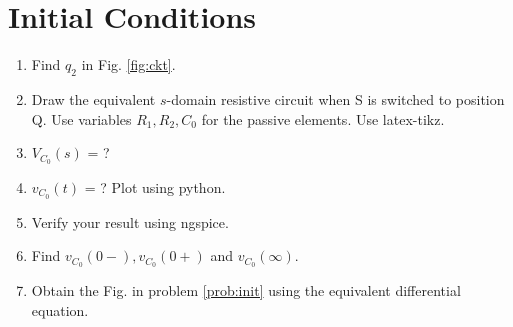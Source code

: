 \documentclass[journal,12pt,twocolumn]{IEEEtran}
\renewcommand\thesection{\arabic{section}}
\begin{document}
\section{Initial Conditions}
\begin{enumerate}[label=\arabic*.,ref=\thesection.\theenumi]
\item Find $q_2$ in Fig. 
			\ref{fig:ckt}.
\item Draw the equivalent $s$-domain resistive circuit when S is switched to position Q.  Use variables $R_1, R_2, C_0$ for the passive elements.
Use latex-tikz.
		\label{prob:init}
	
		\item $V_{C_0}(s)$ = ?  
	\item $v_{C_0}(t)$ = ? Plot using python.
	\item Verify your result using ngspice.
	\item Find $v_{C_0}(0-), v_{C_0}(0+)$ and  $v_{C_0}(\infty) $. 
	\item Obtain the Fig.  in problem 
		\ref{prob:init}
			using the equivalent differential equation.


	\end{enumerate}
\end{document}
